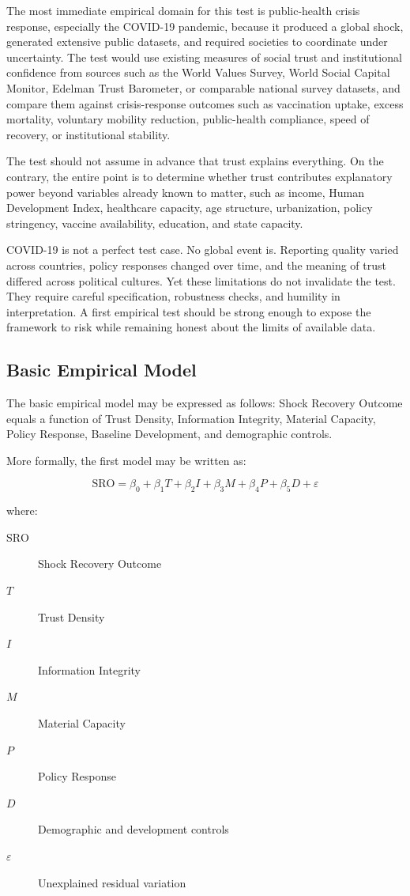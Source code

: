 \documentclass[12pt]{article}
\begin{document}
The most immediate empirical domain for this test is public-health crisis response, especially the COVID-19 pandemic, because it produced a global shock, generated extensive public datasets, and required societies to coordinate under uncertainty. The test would use existing measures of social trust and institutional confidence from sources such as the World Values Survey, World Social Capital Monitor, Edelman Trust Barometer, or comparable national survey datasets, and compare them against crisis-response outcomes such as vaccination uptake, excess mortality, voluntary mobility reduction, public-health compliance, speed of recovery, or institutional stability.

The test should not assume in advance that trust explains everything. On the contrary, the entire point is to determine whether trust contributes explanatory power beyond variables already known to matter, such as income, Human Development Index, healthcare capacity, age structure, urbanization, policy stringency, vaccine availability, education, and state capacity.

COVID-19 is not a perfect test case. No global event is. Reporting quality varied across countries, policy responses changed over time, and the meaning of trust differed across political cultures. Yet these limitations do not invalidate the test. They require careful specification, robustness checks, and humility in interpretation. A first empirical test should be strong enough to expose the framework to risk while remaining honest about the limits of available data.

\subsection{Basic Empirical Model}

The basic empirical model may be expressed as follows: Shock Recovery Outcome equals a function of Trust Density, Information Integrity, Material Capacity, Policy Response, Baseline Development, and demographic controls.

More formally, the first model may be written as:

\[
\mathrm{SRO}=\beta_0+\beta_1T+\beta_2I+\beta_3M+\beta_4P+\beta_5D+\varepsilon
\]

where:

\begin{description}
  \item[\(\mathrm{SRO}\)] Shock Recovery Outcome
  \item[\(T\)] Trust Density
  \item[\(I\)] Information Integrity
  \item[\(M\)] Material Capacity
  \item[\(P\)] Policy Response
  \item[\(D\)] Demographic and development controls
  \item[\(\varepsilon\)] Unexplained residual variation
\end{description}
\end{document}
